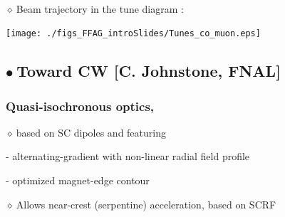 \documentclass[12pt]{article}
\newcommand{\nib}{\noindent \ensuremath{\bullet~}}
\newcommand{\nid}{\noindent \ensuremath{\diamond~}}
\newcommand{\black}{\color{black}}
\newcommand{\blue}{\color{blue}}
\begin{document}
\begin{minipage}{1.\linewidth}
\begin{minipage}{.5\linewidth}
\begin{center}
~~~~~



{\Large 
\blue  
\nid Beam trajectory in the tune diagram : 
}

 \texttt{[image: ./figs\_FFAG\_introSlides/Tunes\_co\_muon.eps]}

 \end{center}


\end{minipage}


\end{minipage}










\clearpage

\subsection*{\LARGE \blue \nib \bf \blue Toward CW [C. Johnstone, FNAL]}

\LARGE

\vspace{-1ex}

\medskip

\subsubsection*{\LARGE \black Quasi-isochronous optics, } 

\vspace{-1ex}

\nid based on SC dipoles and featuring

- alternating-gradient with non-linear radial field profile 

-  optimized magnet-edge contour


\medskip

\blue 

\nid Allows near-crest (serpentine) acceleration, based on  SCRF

\black

\vspace{2ex}
\end{document}
